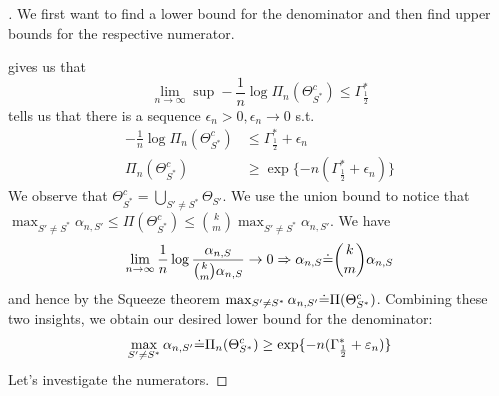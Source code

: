 \begin{proof}[]
  We first want to find a lower bound for the denominator and then find upper
  bounds for the respective numerator.

   gives us that
  \[\lim_{n \rightarrow \infty} \sup - \frac{1}{n} \log \Pi_n(\Theta^c_{S^*})
      \leq \Gamma^*_{\frac{1}{2}}\]
   tells us that there is a sequence $\epsilon_n > 0,
  \epsilon_n \rightarrow 0$ s.t.
  \begin{align}
    - \frac{1}{n} \log \Pi_n(\Theta^c_{S^*}) &\leq \Gamma^*_{\frac{1}{2}} +
        \epsilon_n \label{eq: epsilon}\\
   \Pi_n(\Theta^c_{S^*}) &\geq \exp\{-n (\Gamma^*_{\frac{1}{2}} + \epsilon_n)\}
  \end{align}
  We observe that $\Theta^c_{S^*} = \bigcup_{S' \neq S^*} \Theta_{S'}$. We use
  the union bound to notice that $ \max_{S' \neq S^*} \alpha_{n, S'} \leq
  \Pi(\Theta_{S^*}^c) \leq {k \choose m} \max_{S' \neq S^*} \alpha_{n, S'}$. We
  have \[\lim_{n \rightarrow \infty} \frac{1}{n} \log\frac{\alpha_{n, S}}{{k
  \choose m} \alpha_{n, S}} \rightarrow 0 \Rightarrow \alpha_{n, S} \dot{=} {k
  \choose m} \alpha_{n, S}\] and hence by the Squeeze theorem $\max_{S' \neq
  S^*} \alpha_{n, S'} \dot{=} \Pi(\Theta_{S^*}^c)$. Combining these two insights,
  we obtain our desired lower bound for the denominator: \[\max_{S' \neq S^*}
  \alpha_{n, S'} \dot{=} \Pi_n(\Theta^c_{S^*}) \geq \exp\{-n
  (\Gamma^*_{\frac{1}{2}} + \varepsilon_n)\}\] Let's investigate the numerators.


\end{proof}
